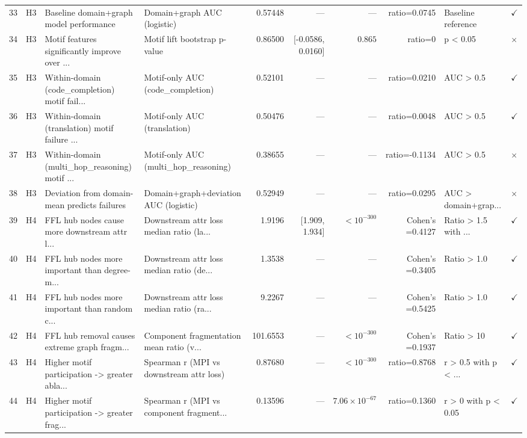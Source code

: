 \documentclass[11pt,a4paper]{article}
\begin{document}
\begin{landscape}
\begin{longtable}{rlp{3.2cm}p{3cm}rrrrp{1.5cm}l}
\rowcolor{rowgray}
33 & H3 & Baseline domain+graph model performance & Domain+graph AUC (logistic) & 0.57448 & --- & --- & ratio=0.0745 & Baseline reference & $\checkmark$ \\
34 & H3 & Motif features significantly improve over ... & Motif lift bootstrap p-value & 0.86500 & [-0.0586, 0.0160] & $0.865$ & ratio=0 & p \textless{} 0.05 & $\times$ \\
\rowcolor{rowgray}
35 & H3 & Within-domain (code\_completion) motif fail... & Motif-only AUC (code\_completion) & 0.52101 & --- & --- & ratio=0.0210 & AUC \textgreater{} 0.5 & $\checkmark$ \\
36 & H3 & Within-domain (translation) motif failure ... & Motif-only AUC (translation) & 0.50476 & --- & --- & ratio=0.0048 & AUC \textgreater{} 0.5 & $\checkmark$ \\
\rowcolor{rowgray}
37 & H3 & Within-domain (multi\_hop\_reasoning) motif ... & Motif-only AUC (multi\_hop\_reasoning) & 0.38655 & --- & --- & ratio=-0.1134 & AUC \textgreater{} 0.5 & $\times$ \\
38 & H3 & Deviation from domain-mean predicts failures & Domain+graph+deviation AUC (logistic) & 0.52949 & --- & --- & ratio=0.0295 & AUC \textgreater{} domain+grap... & $\times$ \\
\midrule
\rowcolor{rowgray}
39 & H4 & FFL hub nodes cause more downstream attr l... & Downstream attr loss median ratio (la... & 1.9196 & [1.909, 1.934] & $<10^{-300}$ & Cohen's =0.4127 & Ratio \textgreater{} 1.5 with ... & $\checkmark$ \\
40 & H4 & FFL hub nodes more important than degree-m... & Downstream attr loss median ratio (de... & 1.3538 & --- & --- & Cohen's =0.3405 & Ratio \textgreater{} 1.0 & $\checkmark$ \\
\rowcolor{rowgray}
41 & H4 & FFL hub nodes more important than random c... & Downstream attr loss median ratio (ra... & 9.2267 & --- & --- & Cohen's =0.5425 & Ratio \textgreater{} 1.0 & $\checkmark$ \\
42 & H4 & FFL hub removal causes extreme graph fragm... & Component fragmentation mean ratio (v... & 101.6553 & --- & $<10^{-300}$ & Cohen's =0.1937 & Ratio \textgreater{} 10 & $\checkmark$ \\
\rowcolor{rowgray}
43 & H4 & Higher motif participation -\textgreater{} greater abla... & Spearman r (MPI vs downstream attr loss) & 0.87680 & --- & $<10^{-300}$ & ratio=0.8768 & r \textgreater{} 0.5 with p \textless{} ... & $\checkmark$ \\
44 & H4 & Higher motif participation -\textgreater{} greater frag... & Spearman r (MPI vs component fragment... & 0.13596 & --- & $7.06 \times 10^{-67}$ & ratio=0.1360 & r \textgreater{} 0 with p \textless{} 0.05 & $\checkmark$ \\

\end{longtable}
\end{landscape}
\end{document}
